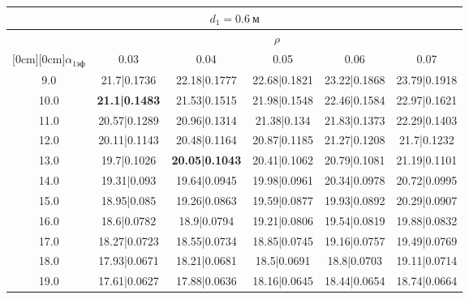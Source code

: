 \documentclass[20pt]{article}
\begin{document}
\begin{center}
\begin{tabular}{c|ccccc}
\hline
	\multicolumn{6}{c}{$d_{1}=0.6 \ м$} \\
\hline
	 & \multicolumn{5}{|c}{$\rho$} \\
	\cline{2-6}
	\raisebox{1.5ex}[0cm][0cm]{$\alpha_{1эф}$} & 0.03 & 0.04 & 0.05 & 0.06 & 0.07\\
\hline
	9.0 & 	21.7|0.1736 & 	22.18|0.1777 & 	22.68|0.1821 & 	23.22|0.1868 & 	23.79|0.1918\\
	10.0 & 	\textbf{21.1|0.1483} & 	21.53|0.1515 & 	21.98|0.1548 & 	22.46|0.1584 & 	22.97|0.1621\\
	11.0 & 	20.57|0.1289 & 	20.96|0.1314 & 	21.38|0.134 & 	21.83|0.1373 & 	22.29|0.1403\\
	12.0 & 	20.11|0.1143 & 	20.48|0.1164 & 	20.87|0.1185 & 	21.27|0.1208 & 	21.7|0.1232\\
	13.0 & 	19.7|0.1026 & 	\textbf{20.05|0.1043} & 	20.41|0.1062 & 	20.79|0.1081 & 	21.19|0.1101\\
	14.0 & 	19.31|0.093 & 	19.64|0.0945 & 	19.98|0.0961 & 	20.34|0.0978 & 	20.72|0.0995\\
	15.0 & 	18.95|0.085 & 	19.26|0.0863 & 	19.59|0.0877 & 	19.93|0.0892 & 	20.29|0.0907\\
	16.0 & 	18.6|0.0782 & 	18.9|0.0794 & 	19.21|0.0806 & 	19.54|0.0819 & 	19.88|0.0832\\
	17.0 & 	18.27|0.0723 & 	18.55|0.0734 & 	18.85|0.0745 & 	19.16|0.0757 & 	19.49|0.0769\\
	18.0 & 	17.93|0.0671 & 	18.21|0.0681 & 	18.5|0.0691 & 	18.8|0.0703 & 	19.11|0.0714\\
	19.0 & 	17.61|0.0627 & 	17.88|0.0636 & 	18.16|0.0645 & 	18.44|0.0654 & 	18.74|0.0664\\
\end{tabular}


\end{center}
\end{document}
